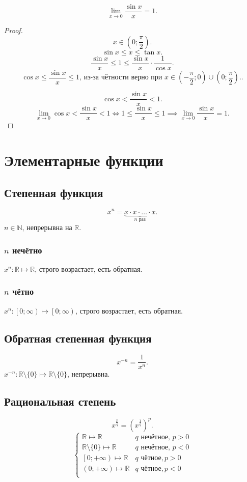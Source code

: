 \documentclass[11pt, oneside]{article}   	%
\begin{document}
\begin{theorem}
    \[ \lim\limits_{x \to 0} \frac{\sin x}{x} = 1 .\]
    \begin{proof}
        \[ x\in \left( 0; \frac{\pi}{2} \right)  .\] 
        \[ \sin x \le  x \le  \tan x .\]
        \[ \frac{\sin x}{x} \le  1 \le  \frac{\sin x}{x} \cdot \frac{1}{\cos x} .\]
        \[ \cos x \le \frac{\sin x}{x} \le 1 \text{, из-за чётности верно при $x\in \left( -\frac{\pi}{2}; 0 \right) \cup \left( 0; \frac{\pi}{2} \right)  $.} .\]

        \[ \cos x < \frac{\sin x}{x} < 1 .\]
        \[ \lim\limits_{x \to 0} \cos x < \frac{\sin x}{x} < 1  \iff 1 \le \frac{\sin x}{x} \le 1 \implies \lim\limits_{x \to 0} \frac{\sin x}{x} = 1.\] 
    \end{proof}
\end{theorem}
\section{Элементарные функции}
    \subsection{Степенная функция}
    \[ x^{n} = \underbrace{x \cdot x \cdot \ldots \cdot x}_{\text{$n$ раз}} .\]
    $n\in \mathbb{N}$, непрерывна на $\mathbb{R}$.\\
    \subsubsection{$n$ нечётно}
        $x ^{n}: \mathbb{R} \mapsto \mathbb{R}$, строго возрастает, есть обратная.
    \subsubsection{$n$ чётно}
    $x^{n}: \left[0;\infty \right) \mapsto \left[0;\infty \right)$, строго возрастает, есть обратная.
    \subsection{Обратная степенная функция}
    \[ x^{-n} = \frac{1}{x^{n}} .\]
    $x^{-n}: \mathbb{R}\setminus \{0\} \mapsto \mathbb{R}\setminus \{0\}  $, непрерывна.
    \subsection{Рациональная степень}
    \[ x^{\frac{p}{q}} = \left(x^{\frac{1}{q}}\right)^{p} .\]
    \begin{equation*}
        \begin{cases}
            \mathbb{R} \mapsto \mathbb{R} & q \text{ нечётное, } p>0\\
            \mathbb{R}\setminus \{0\} \mapsto \mathbb{R} & q \text{ нечётное, } p<0\\
            \left[0; +\infty\right) \mapsto \mathbb{R} & q \text{ чётное}, p>0\\
            \left(0; +\infty\right) \mapsto \mathbb{R} & q \text{ чётное}, p<0\\
        \end{cases}
    \end{equation*}
\end{document}
